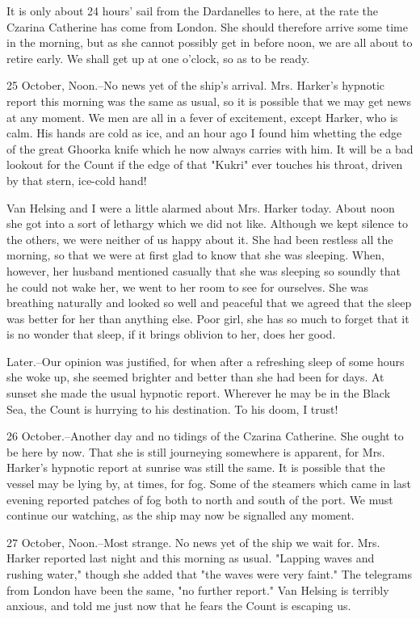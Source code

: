 It is only about 24 hours' sail from the Dardanelles to here, at the rate the Czarina Catherine has come from London. She should therefore arrive some time in the morning, but as she cannot possibly get in before noon, we are all about to retire early. We shall get up at one o'clock, so as to be ready. 

25 October, Noon.--No news yet of the ship's arrival. Mrs. Harker's hypnotic report this morning was the same as usual, so it is possible that we may get news at any moment. We men are all in a fever of excitement, except Harker, who is calm. His hands are cold as ice, and an hour ago I found him whetting the edge of the great Ghoorka knife which he now always carries with him. It will be a bad lookout for the Count if the edge of that "Kukri" ever touches his throat, driven by that stern, ice-cold hand! 

Van Helsing and I were a little alarmed about Mrs. Harker today. About noon she got into a sort of lethargy which we did not like. Although we kept silence to the others, we were neither of us happy about it. She had been restless all the morning, so that we were at first glad to know that she was sleeping. When, however, her husband mentioned casually that she was sleeping so soundly that he could not wake her, we went to her room to see for ourselves. She was breathing naturally and looked so well and peaceful that we agreed that the sleep was better for her than anything else. Poor girl, she has so much to forget that it is no wonder that sleep, if it brings oblivion to her, does her good. 

Later.--Our opinion was justified, for when after a refreshing sleep of some hours she woke up, she seemed brighter and better than she had been for days. At sunset she made the usual hypnotic report. Wherever he may be in the Black Sea, the Count is hurrying to his destination. To his doom, I trust! 

26 October.--Another day and no tidings of the Czarina Catherine. She ought to be here by now. That she is still journeying somewhere is apparent, for Mrs. Harker's hypnotic report at sunrise was still the same. It is possible that the vessel may be lying by, at times, for fog. Some of the steamers which came in last evening reported patches of fog both to north and south of the port. We must continue our watching, as the ship may now be signalled any moment. 

27 October, Noon.--Most strange. No news yet of the ship we wait for. Mrs. Harker reported last night and this morning as usual. "Lapping waves and rushing water," though she added that "the waves were very faint." The telegrams from London have been the same, "no further report." Van Helsing is terribly anxious, and told me just now that he fears the Count is escaping us. 

